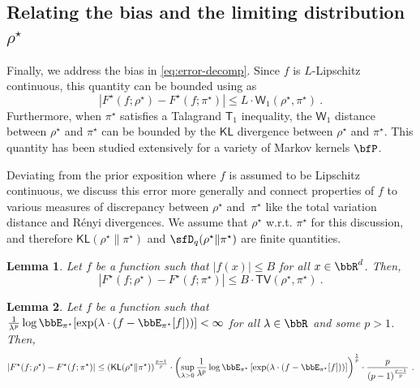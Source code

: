 \documentclass[11pt]{article}
\newtheorem{lemma}{Lemma}[section]
\newcounter{ct}
\begin{document}
\subsection{Relating the bias and the limiting distribution \(\rho^{\star}\)}

Finally, we address the bias in \cref{eq:error-decomp}.
Since \(f\) is \(L\)-Lipschitz continuous, this quantity can be bounded using  as
\begin{equation*}
    \left| F^{\star}(f; \rho^{\star}) - F^{\star}(f; \pi^{\star})\right| \leq L \cdot \mathsf{W}_{1}(\rho^{\star}, \pi^{\star})~.
\end{equation*}
Furthermore, when \(\pi^{\star}\) satisfies a Talagrand \(\mathsf{T}_{1}\) inequality, the \(\mathsf{W}_{1}\) distance between \(\rho^{\star}\) and \(\pi^{\star}\) can be bounded by the \(\mathsf{KL}\) divergence between \(\rho^{\star}\) and \(\pi^{\star}\).
This quantity has been studied extensively for a variety of Markov kernels \(\bfP\).

Deviating from the prior exposition where \(f\) is assumed to be Lipschitz continuous, we discuss this error more generally and connect properties of \(f\) to various measures of discrepancy between \(\rho^{\star}\) and\ \(\pi^{\star}\) like the total variation distance and R\'{e}nyi divergences.
We assume that \(\rho^{\star}\) w.r.t. \(\pi^{\star}\) for this discussion, and therefore \(\mathsf{KL}(\rho^{\star} \| \pi^{\star})\) and \(\sfD_{q}(\rho^{\star} \| \pi^{\star})\) are finite quantities.

\begin{lemma}
\label{lem:tv-bounded}
Let \(f\) be a function such that \(|f(x)| \leq B\) for all \(x \in \bbR^{d}\).
Then,
\begin{equation*}
    |F^{\star}(f; \rho^{\star}) - F^{\star}(f; \pi^{\star})| \leq B \cdot \mathsf{TV}(\rho^{\star}, \pi^{\star})~.
\end{equation*}
\end{lemma}

\begin{lemma}
\label{lem:kl-mgf}
Let \(f\) be a function such that \(\frac{1}{\lambda^{p}}\log \bbE_{\pi^{\star}}[\exp(\lambda \cdot (f - \bbE_{\pi^{\star}}[f]))] < \infty\) for all \(\lambda \in \bbR\) and some \(p > 1\).
Then,
\begin{equation*}
    \left|F^{\star}(f; \rho^{\star}) - F^{\star}(f; \pi^{\star})\right| \leq \left(\mathsf{KL}(\rho^{\star} \| \pi^{\star})\right)^{\frac{p - 1}{p}} \cdot \left(\sup_{\lambda > 0} \frac{1}{\lambda^{p}} \log \bbE_{\pi^{\star}}\left[\exp(\lambda \cdot (f - \bbE_{\pi^{\star}}[f]))\right] \right)^{\frac{1}{p}} \cdot \frac{p}{(p - 1)^{\frac{p - 1}{p}}}~.
\end{equation*}
\end{lemma}
\end{document}
